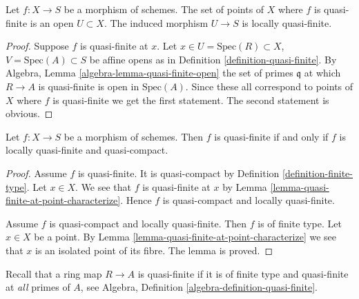 \begin{lemma}
\label{lemma-quasi-finite-points-open}
Let $f : X \to S$ be a morphism of schemes.
The set of points of $X$ where $f$ is quasi-finite is an open
$U \subset X$. The induced morphism $U \to S$ is locally quasi-finite.
\end{lemma}

\begin{proof}
Suppose $f$ is quasi-finite at $x$.
Let $x \in U = \text{Spec}(R) \subset X$, $V = \text{Spec}(A) \subset S$
be affine opens as in Definition \ref{definition-quasi-finite}.
By Algebra, Lemma \ref{algebra-lemma-quasi-finite-open} the set
of primes $\mathfrak q$ at which $R \to A$ is quasi-finite
is open in $\text{Spec}(A)$. Since these all correspond to points
of $X$ where $f$ is quasi-finite we get the first statement.
The second statement is obvious.
\end{proof}

\begin{lemma}
\label{lemma-quasi-finite-locally-quasi-compact}
Let $f : X \to S$ be a morphism of schemes.
Then $f$ is quasi-finite if and only if $f$ is
locally quasi-finite and quasi-compact.
\end{lemma}

\begin{proof}
Assume $f$ is quasi-finite. It is quasi-compact by Definition
\ref{definition-finite-type}. Let $x \in X$.
We see that $f$ is quasi-finite at $x$ by
Lemma \ref{lemma-quasi-finite-at-point-characterize}.
Hence $f$ is quasi-compact and locally quasi-finite.

\medskip\noindent
Assume $f$ is quasi-compact and locally quasi-finite.
Then $f$ is of finite type. Let $x \in X$ be a point.
By Lemma \ref{lemma-quasi-finite-at-point-characterize}
we see that $x$ is an isolated point of its fibre.
The lemma is proved.
\end{proof}

\noindent
Recall that a ring map $R \to A$ is quasi-finite if it is
of finite type and quasi-finite at {\it all} primes of $A$, see
Algebra, Definition \ref{algebra-definition-quasi-finite}.


